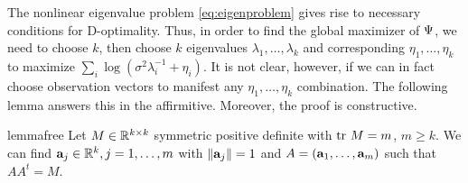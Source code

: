 \documentclass{amsart}
\numberwithin{equation}{section}
\begin{document}


  



The nonlinear eigenvalue problem \eqref{eq:eigenproblem} gives rise to
necessary conditions for D-optimality. Thus, in order to find the
global maximizer of $\Psi$, we need to choose $k$, then choose $k$
eigenvalues $\lambda_1, \dots, \lambda_k$ and corresponding $\eta_1,
\dots, \eta_k$ to maximize $\sum_i \log( \sigma^2\lambda_i^{-1} +
\eta_i)$. It is not clear, however, if we can in fact choose
observation vectors to manifest any $\eta_1, \dots, \eta_k$
combination. The following lemma answers this in the
affirmitive. Moreover, the proof is constructive.

\begin{restatable*}{lemma}{free}\label{lemma:free}
  Let $M \in \mathbb{R}^{k \times k}$ symmetric positive definite with $\textup{tr}\ M
  = m$, $m \geq k$. We can find $\mathbf{a}_j \in \mathbb{R}^k,j=1,\dots,m$
  with $\|\mathbf{a}_j\|=1$ and $A = (\mathbf{a}_1,\dots,\mathbf{a}_m)$ such that
  $AA^t = M$.
\end{restatable*}
\end{document}

